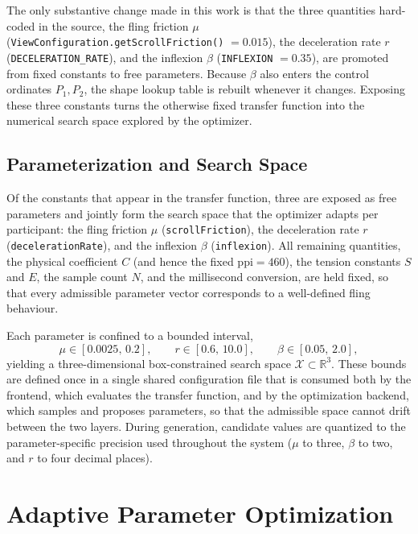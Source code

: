 The only substantive change made in this work is that the three quantities hard-coded in the source, the fling friction $\mu$ (\texttt{ViewConfiguration.getScrollFriction()} $=0.015$), the deceleration rate $r$ (\texttt{DECELERATION\_RATE}), and the inflexion $\beta$ (\texttt{INFLEXION} $=0.35$), are promoted from fixed constants to free parameters. Because $\beta$ also enters the control ordinates $P_1,P_2$, the shape lookup table is rebuilt whenever it changes. Exposing these three constants turns the otherwise fixed transfer function into the numerical search space explored by the optimizer.

\subsection{Parameterization and Search Space}

Of the constants that appear in the transfer function, three are exposed as free parameters and jointly form the search space that the optimizer adapts per participant: the fling friction $\mu$ (\texttt{scrollFriction}), the deceleration rate $r$ (\texttt{decelerationRate}), and the inflexion $\beta$ (\texttt{inflexion}). All remaining quantities, the physical coefficient $C$ (and hence the fixed $\mathrm{ppi}=460$), the tension constants $S$ and $E$, the sample count $N$, and the millisecond conversion, are held fixed, so that every admissible parameter vector corresponds to a well-defined fling behaviour.

Each parameter is confined to a bounded interval,
\begin{equation}
  \mu \in [0.0025,\,0.2],
  \qquad
  r \in [0.6,\,10.0],
  \qquad
  \beta \in [0.05,\,2.0],
\end{equation}
yielding a three-dimensional box-constrained search space $\mathcal{X}\subset\mathbb{R}^3$. These bounds are defined once in a single shared configuration file that is consumed both by the frontend, which evaluates the transfer function, and by the optimization backend, which samples and proposes parameters, so that the admissible space cannot drift between the two layers. During generation, candidate values are quantized to the parameter-specific precision used throughout the system ($\mu$ to three, $\beta$ to two, and $r$ to four decimal places).

\section{Adaptive Parameter Optimization}

